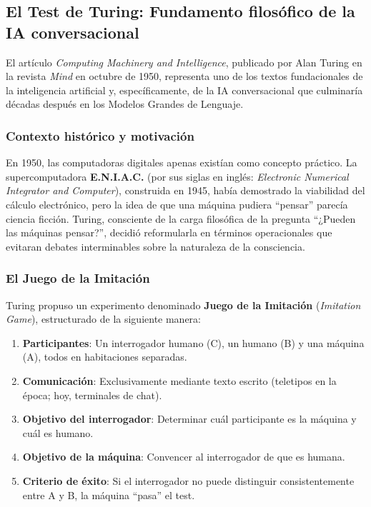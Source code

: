 \documentclass[12pt,a4paper]{report}
\numberwithin{figure}{section}
\begin{document}
\subsection[El Test de Turing]{El Test de Turing: Fundamento filosófico de la IA conversacional}
\label{subsec:test_turing}

El artículo \textit{Computing Machinery and Intelligence}, publicado por Alan Turing en la revista \textit{Mind} en octubre de 1950, representa uno de los textos fundacionales de la inteligencia artificial y, específicamente, de la IA conversacional que culminaría décadas después en los Modelos Grandes de Lenguaje.

\subsubsection{Contexto histórico y motivación}
\label{subsubsec:contexto_turing}

En 1950, las computadoras digitales apenas existían como concepto práctico. La supercomputadora \textbf{E.N.I.A.C.} (por sus siglas en inglés: \textit{Electronic Numerical Integrator and Computer}), construida en 1945, había demostrado la viabilidad del cálculo electrónico, pero la idea de que una máquina pudiera ``pensar'' parecía ciencia ficción. Turing, consciente de la carga filosófica de la pregunta ``¿Pueden las máquinas pensar?'', decidió reformularla en términos operacionales que evitaran debates interminables sobre la naturaleza de la consciencia.

\subsubsection{El Juego de la Imitación}
\label{subsubsec:juego_imitacion}

Turing propuso un experimento denominado \textbf{Juego de la Imitación} (\textit{Imitation Game}), estructurado de la siguiente manera:

\begin{enumerate}
    \item \textbf{Participantes}: Un interrogador humano (C), un humano (B) y una máquina (A), todos en habitaciones separadas.
    \item \textbf{Comunicación}: Exclusivamente mediante texto escrito (teletipos en la época; hoy, terminales de chat).
    \item \textbf{Objetivo del interrogador}: Determinar cuál participante es la máquina y cuál es humano.
    \item \textbf{Objetivo de la máquina}: Convencer al interrogador de que es humana.
    \item \textbf{Criterio de éxito}: Si el interrogador no puede distinguir consistentemente entre A y B, la máquina ``pasa'' el test.
\end{enumerate}
\end{document}
